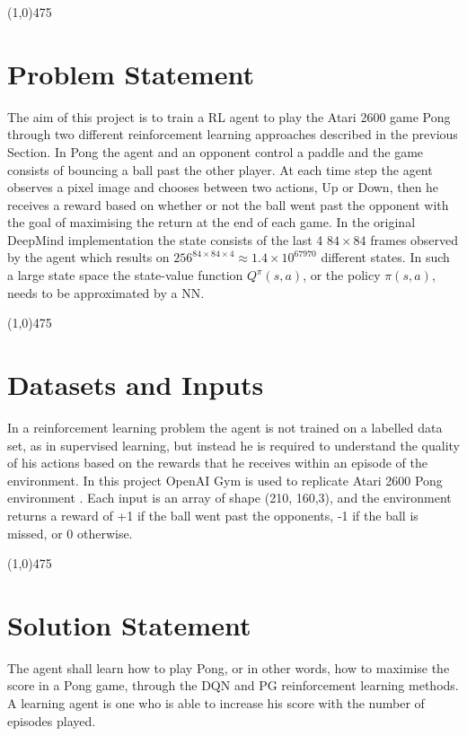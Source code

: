 \documentclass[a4paper, 11pt]{article}
\newcommand{\hl}{\begin{center} \line(1,0){475} \end{center}} %
\begin{document}
\hl 

\section*{Problem Statement}

The aim of this project is to train a RL agent to play the Atari 2600 game Pong \cite{OpenAI} through two different reinforcement learning approaches described in the previous Section. In Pong the agent and an opponent control a paddle and the game consists of bouncing a ball past the other player. At each time step the agent observes a pixel image and chooses between two actions, Up or Down, then he receives a reward based on whether or not the ball went past the opponent with the goal of maximising the return at the end of each game. In the original DeepMind implementation \cite{Mnih2013,Mnih2016} the state consists of the last 4 $84 \times 84$ frames observed by the agent which results on $256^{84 \times 84 \times 4} \approx 1.4 \times 10^67970$ different states. In such a large state space the state-value function $Q^{\pi}(s,a) $, or the policy  $\pi(s,a)$, needs to be approximated by a NN. 

\hl 

\section*{Datasets and Inputs}

In a reinforcement learning problem the agent is not trained on a labelled data set, as in supervised learning, but instead he is required to understand the quality of his actions based on the rewards that he receives within an episode of the environment. In this project OpenAI Gym is used to replicate Atari 2600 Pong environment \cite{OpenAI}. Each input is an array of shape (210, 160,3), and the environment returns a reward of +1 if the ball went past the opponents, -1 if the ball is missed, or 0 otherwise. 

\hl 

\section*{Solution Statement}

The agent shall learn how to play Pong, or in other words, how to maximise the score in a Pong game, through the DQN and PG reinforcement learning methods. A learning agent is one who is able to increase his score with the number of episodes played.
\end{document}
